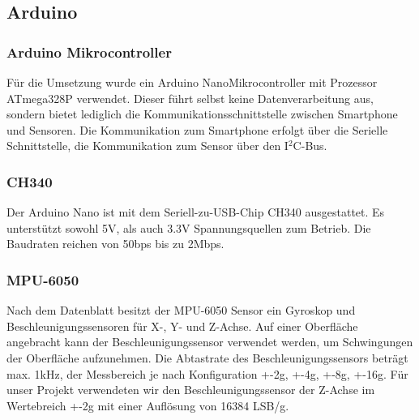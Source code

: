 \subsection*{Arduino}
\label{sec:Arduino}

\subsubsection*{Arduino Mikrocontroller}
Für die Umsetzung wurde ein \glqq Arduino Nano\grqq Mikrocontroller mit Prozessor ATmega328P verwendet. Dieser führt selbst keine Datenverarbeitung aus, sondern bietet lediglich die Kommunikationsschnittstelle zwischen Smartphone und Sensoren. Die Kommunikation zum Smartphone erfolgt über die Serielle Schnittstelle, die Kommunikation zum Sensor über den I$^2$C-Bus. 


\subsubsection*{CH340}
Der Arduino Nano ist mit dem  Seriell-zu-USB-Chip CH340 ausgestattet.
Es unterstützt sowohl 5V, als auch 3.3V Spannungsquellen zum Betrieb.
Die Baudraten reichen von 50bps bis zu 2Mbps.


\subsubsection*{MPU-6050}
Nach dem Datenblatt \cite{MPU6050} besitzt der MPU-6050 Sensor ein Gyroskop und Beschleunigungssensoren für X-, Y- und Z-Achse.
Auf einer Oberfläche angebracht kann der Beschleunigungssensor verwendet werden, um Schwingungen der Oberfläche aufzunehmen.
Die Abtastrate des Beschleunigungssensors beträgt max. 1kHz, der Messbereich je nach Konfiguration +-2g, +-4g, +-8g, +-16g.
Für unser Projekt verwendeten wir den Beschleunigungssensor der Z-Achse im Wertebreich +-2g mit einer Auflösung von 16384 LSB/g.
